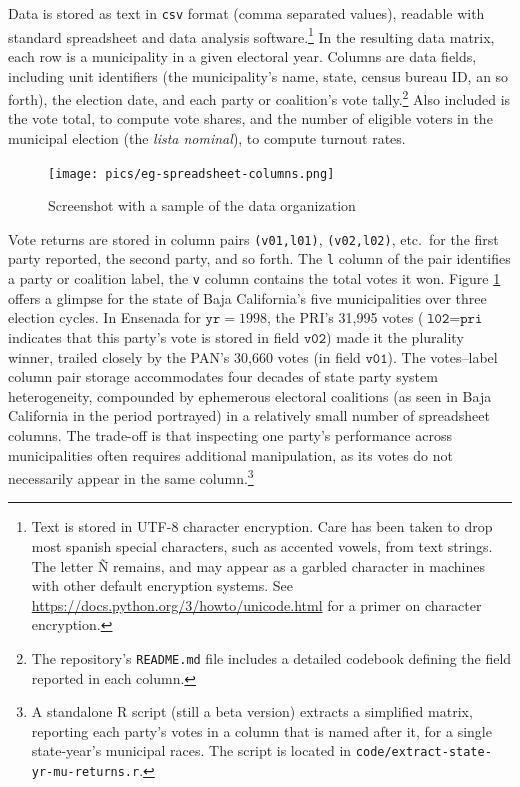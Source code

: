 \documentclass[letter,12pt]{article}
\newcommand{\emm}[1]{\todo[color=red!15, inline]{\textbf{Eric:} #1}}
\begin{document}
Data is stored as text in \verb|csv| format (comma separated values), readable with standard spreadsheet and data analysis software.\footnote{Text is stored in UTF-8 character encryption. Care has been taken to drop most spanish special characters, such as accented vowels, from text strings. The letter \~N remains, and may appear as a garbled character in machines with other default encryption systems. See \url{https://docs.python.org/3/howto/unicode.html} for a primer on character encryption.} In the resulting data matrix, each row is a municipality in a given electoral year. Columns are data fields, including unit identifiers (the municipality's name, state, census bureau ID, an so forth), the election date, and each party or coalition's vote tally.\footnote{The repository's \verb|README.md| file includes a detailed codebook defining the field reported in each column.} Also included is the vote total, to compute vote shares, and the number of eligible voters in the municipal election (the \emph{lista nominal}), to compute turnout rates.  

\begin{figure}
  \centering
  \texttt{[image: pics/eg-spreadsheet-columns.png]}
  \caption{Screenshot with a sample of the data organization}\label{F:scrn}
\end{figure}  

Vote returns are stored in column pairs \verb|(v01,l01)|, \verb|(v02,l02)|, etc.\ for the first party reported, the second party, and so forth. The \verb|l| column of the pair identifies a party or coalition label, the \verb|v| column contains the total votes it won. Figure \ref{F:scrn} offers a glimpse for the state of Baja California's five municipalities over three election cycles. In Ensenada for $\texttt{yr} = 1998$, the PRI's 31,995 votes ($\texttt{l02} = \texttt{pri}$ indicates that this party's vote is stored in field $\texttt{v02}$) made it the plurality winner, trailed closely by the PAN's 30,660 votes (in field $\texttt{v01}$). The votes--label column pair storage accommodates four decades of state party system heterogeneity, compounded by ephemerous electoral coalitions (as seen in Baja California in the period portrayed) in a relatively small number of spreadsheet columns. The trade-off is that inspecting one party's performance across municipalities often requires additional manipulation, as its votes do not necessarily appear in the same column.\footnote{A standalone R script (still a beta version) extracts a simplified matrix, reporting each party's votes in a column that is named after it, for a single state-year's municipal races. The script is located in \verb|code/extract-state-yr-mu-returns.r|.} %
\end{document}

